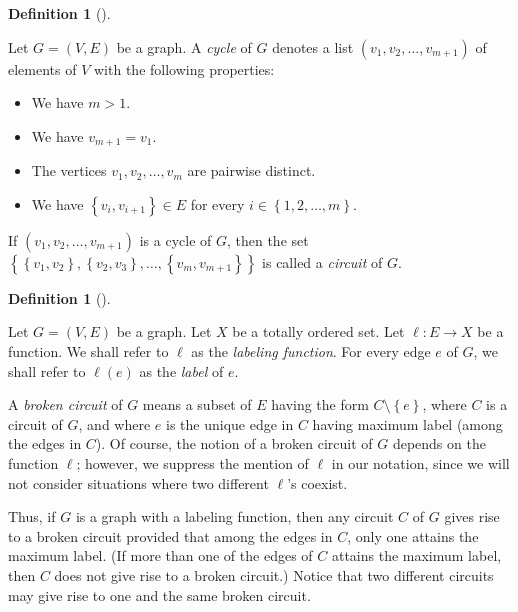 \documentclass[numbers=enddot,12pt,final,onecolumn,notitlepage]{scrartcl}%
\theoremstyle{definition}
\newtheorem{defi}[theo]{Definition}
\newenvironment{definition}[1][]
{\begin{defi}[#1]\begin{leftbar}}
{\end{leftbar}\end{defi}}
\begin{document}
\begin{definition}
\label{def.cycle}Let $G=\left(  V,E\right)  $ be a graph. A \textit{cycle} of
$G$ denotes a list $\left(  v_{1},v_{2},\ldots,v_{m+1}\right)  $ of elements
of $V$ with the following properties:

\begin{itemize}
\item We have $m>1$.

\item We have $v_{m+1}=v_{1}$.

\item The vertices $v_{1},v_{2},\ldots,v_{m}$ are pairwise distinct.

\item We have $\left\{  v_{i},v_{i+1}\right\}  \in E$ for every $i\in\left\{
1,2,\ldots,m\right\}  $.
\end{itemize}

If $\left(  v_{1},v_{2},\ldots,v_{m+1}\right)  $ is a cycle of $G$, then the
set $\left\{  \left\{  v_{1},v_{2}\right\}  ,\left\{  v_{2},v_{3}\right\}
,\ldots,\left\{  v_{m},v_{m+1}\right\}  \right\}  $ is called a
\textit{circuit} of $G$.
\end{definition}

\begin{definition}
\label{def.BC}Let $G=\left(  V,E\right)  $ be a graph. Let $X$ be a totally
ordered set. Let $\ell:E\rightarrow X$ be a function. We shall refer to $\ell$
as the \textit{labeling function}. For every edge $e$ of $G$, we shall refer
to $\ell\left(  e\right)  $ as the \textit{label} of $e$.

A \textit{broken circuit} of $G$ means a subset of $E$ having the form
$C\setminus\left\{  e\right\}  $, where $C$ is a circuit of $G$, and where $e$
is the unique edge in $C$ having maximum label (among the edges in $C$). Of
course, the notion of a broken circuit of $G$ depends on the function $\ell$;
however, we suppress the mention of $\ell$ in our notation, since we will not
consider situations where two different $\ell$'s coexist.
\end{definition}

Thus, if $G$ is a graph with a labeling function, then any circuit $C$ of $G$
gives rise to a broken circuit provided that among the edges in $C$, only one
attains the maximum label. (If more than one of the edges of $C$ attains the
maximum label, then $C$ does not give rise to a broken circuit.) Notice that
two different circuits may give rise to one and the same broken circuit.
\end{document}
